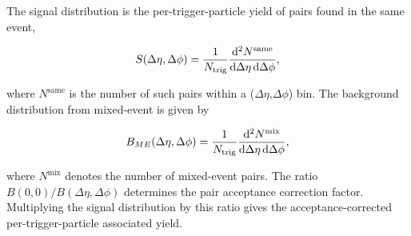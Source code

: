 \begin{enumerate}
The signal distribution is the per-trigger-particle yield of pairs found in the same event,
\begin{linenomath}
\begin{equation}
\label{eq:signal}
S(\Delta\eta,\Delta\phi) = \frac{1}{N_\text{trig}}\frac{\mathrm{d}^{2}N^\text{same}}{\mathrm{d}\Delta\eta\, \mathrm{d}\Delta\phi},
\end{equation}
\end{linenomath}
where $N^\text{same}$ is the number of such pairs within a ($\Delta\eta$,$\Delta\phi$) bin.
The background distribution from mixed-event is given by
\begin{linenomath}
\begin{equation}
\label{eq:background}
B_{ME}(\Delta\eta,\Delta\phi) = \frac{1}{N_\text{trig}}\frac{\mathrm{d}^{2}N^\text{mix}}{\mathrm{d}\Delta\eta\, \mathrm{d}\Delta\phi},
\end{equation}
\end{linenomath}
where $N^\text{mix}$ denotes the number of
mixed-event pairs. %
The ratio $B(0,0)/B(\Delta\eta,\Delta\phi)$
determines the pair acceptance correction
factor. Multiplying the signal distribution by this ratio
gives the acceptance-corrected per-trigger-particle associated
yield.


\end{enumerate}

